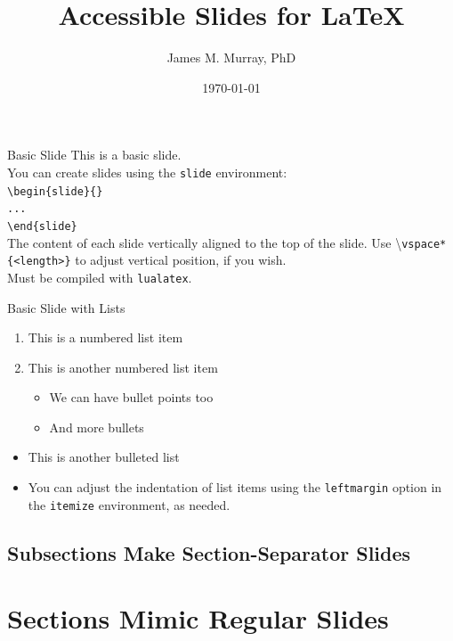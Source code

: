 \documentclass[colortheme={8,92,150}, fontsize=18pt]{accessslides}
\title{Accessible Slides for LaTeX}
\author{James M. Murray, PhD}
\date{\today}
\begin{document}
\maketitle

\begin{slide}{Basic Slide}
  This is a basic slide. \\
  
  You can create slides using the \texttt{slide} environment: \\

  \texttt{\textbackslash begin\{slide\}\{<Slide Title>\}\\
  ... \\
  \textbackslash end\{slide\}} \\

  The content of each slide vertically aligned to the top of the slide. Use \textbackslash\texttt{vspace*\{<length>\}} to adjust vertical position, if you wish. \\

  Must be compiled with \texttt{lualatex}.
\end{slide}

\begin{slide}{Basic Slide with Lists}
  \begin{enumerate}
    \item This is a numbered list item
    \item This is another numbered list item
      \begin{itemize}
        \item We can have bullet points too
        \item And more bullets
      \end{itemize}
  \end{enumerate}
  \begin{itemize}[leftmargin=4pc]
    \item This is another bulleted list
    \item You can adjust the indentation of list items using the \texttt{leftmargin} option in the \texttt{itemize} environment, as needed. 
  \end{itemize}
\end{slide}

\subsection{Subsections Make Section-Separator Slides}

\section{Sections Mimic Regular Slides}
\end{document}
